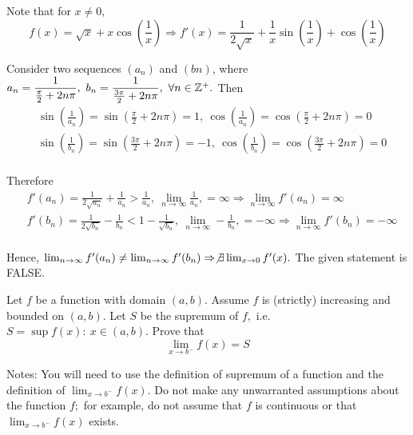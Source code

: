 \documentclass{article}
\begin{document}
\begin{soln}
    Note that for $x \ne 0,$
    \[
        f(x) = \sqrt{x} + x\cos \left( \dfrac{1}{x} \right) \Rightarrow f'(x) = \frac{1}{2\sqrt{x}} + \frac{1}{x} \sin\left( \frac{1}{x} \right) + \cos\left( \frac{1}{x} \right) 
    \]

    Consider two sequences $(a_n)$ and $(bn)$, where $a_n = \dfrac{1}{\frac{\pi}{2} + 2n\pi},\ b_n = \dfrac{1}{\frac{3\pi}{2} + 2n\pi},\ \forall n \in \mathbb Z^{+}.$
    Then
    \[
        \begin{aligned}
            &\sin\left( \frac{1}{a_n} \right) = \sin\left( \frac{\pi}{2} + 2n\pi \right) = 1,\ \cos\left( \frac{1}{a_n} \right) = \cos\left( \frac{\pi}{2} + 2n\pi \right) = 0\\
            &\sin\left( \frac{1}{b_n} \right) = \sin\left( \frac{3\pi}{2} + 2n\pi \right) = -1,\ \cos\left( \frac{1}{b_n} \right) = \cos\left( \frac{3\pi}{2} + 2n\pi \right) = 0\\
        \end{aligned}
    \]

    Therefore
    \[
        \begin{aligned}
            &f'(a_n) = \frac{1}{2\sqrt{a_n}} + \frac{1}{a_n} > \frac{1}{a_n},\ \lim_{n \rightarrow \infty} \frac{1}{a_n}, = \infty 
            \Rightarrow \lim_{n \rightarrow \infty} f'(a_n) = \infty\\
            &f'(b_n) = \frac{1}{2\sqrt{b_n}} - \frac{1}{b_n} < 1 - \frac{1}{\sqrt{b_n}} ,\ \lim_{n \rightarrow \infty} - \frac{1}{b_n}, = - \infty 
            \Rightarrow \lim_{n \rightarrow \infty} f'(b_n) = -\infty\\
        \end{aligned}
    \]

    Hence, $\lim_{n \rightarrow \infty} f'(a_n)  \ne \lim_{n \rightarrow \infty} f'(b_n)  \Rightarrow \not \exists \lim_{x \rightarrow 0} f'(x).$
    The given statement is FALSE.
\end{soln}

\newpage

\begin{problem*}[2]
    Let $f$ be a function with domain $(a, b).$ Assume $f$ is (strictly) increasing and bounded on $(a, b).$
    Let $S$ be the supremum of $f,$ i.e. $S = \sup{f(x):\ x \in (a,b)}.$ Prove that
    \[
        \lim_{x \rightarrow b^{-}} f(x) = S
    \]
    
    Notes: You will need to use the definition of supremum of a function and the definition of $\lim_{x \rightarrow b^{-}} f(x).$
    Do not make any unwarranted assumptions about the function $f;$
    for example, do not assume that $f$ is continuous or that $\lim_{x \rightarrow b^{-}} f(x)$ exists.
\end{problem*}
\end{document}
